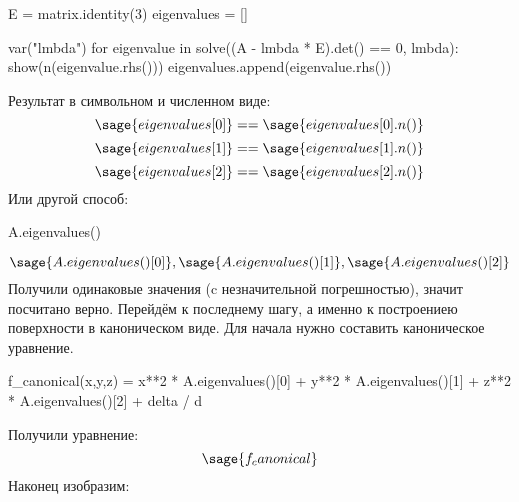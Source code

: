 \documentclass{article}
\begin{document}
\begin{sageblock}
E = matrix.identity(3)
eigenvalues = []

var("lmbda")
for eigenvalue in solve((A - lmbda * E).det() == 0, lmbda):
    show(n(eigenvalue.rhs()))
    eigenvalues.append(eigenvalue.rhs())
\end{sageblock}
Результат в символьном и численном виде:
$$\sage{eigenvalues[0]} == \sage{eigenvalues[0].n()}$$
$$\sage{eigenvalues[1]} == \sage{eigenvalues[1].n()}$$
$$\sage{eigenvalues[2]} == \sage{eigenvalues[2].n()}$$
 Или другой способ:
\begin{sageblock}
A.eigenvalues()
\end{sageblock}
$$\sage{A.eigenvalues()[0]}, \sage{A.eigenvalues()[1]}, \sage{A.eigenvalues()[2]}$$\newline
Получили одинаковые значения (c незначительной погрешностью), значит посчитано верно. \newline
Перейдём к последнему шагу, а именно к построениею поверхности в каноническом виде.
Для начала нужно составить каноническое уравнение.
\begin{sageblock}
f_canonical(x,y,z) = x**2 * A.eigenvalues()[0] +
  y**2 * A.eigenvalues()[1] + z**2 * A.eigenvalues()[2]  + delta / d
\end{sageblock}
Получили уравнение:
$$\sage{f_canonical}$$
Наконец изобразим:
\begin{center}
\end{center}
\end{document}
